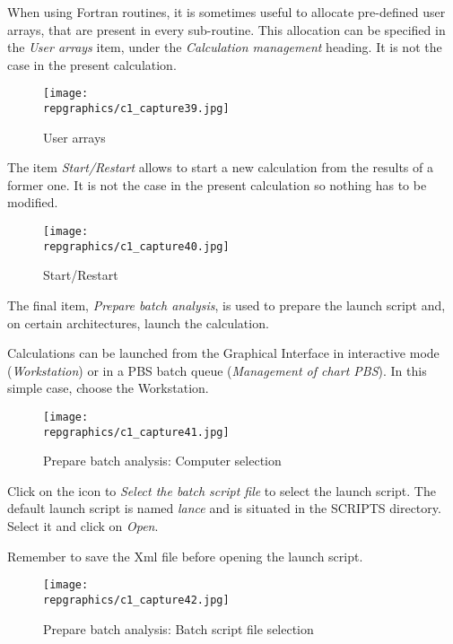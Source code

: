 \clearpage
When using Fortran routines, it is sometimes useful to allocate pre-defined user
arrays, that are present in every sub-routine. This allocation can be specified
in the {\itshape User arrays} item, under the {\itshape Calculation management}
heading. It is not the case in the present calculation.

\begin{figure}[ht]
\begin{center}
\texttt{[image: \\repgraphics/c1\_capture39.jpg]}
\caption{User arrays}
\label{fig39_e1}
\end{center}
\end{figure}


\clearpage
The item {\itshape Start/Restart} allows to start a new calculation from the
results of a former one. It is not the case in the present calculation so
nothing has to be modified.

\begin{figure}[ht]
\begin{center}
\texttt{[image: \\repgraphics/c1\_capture40.jpg]}
\caption{Start/Restart}
\label{fig40_e1}
\end{center}
\end{figure}


\clearpage
The final item, {\itshape Prepare batch analysis}, is used to prepare the launch
script and, on certain architectures, launch the calculation.

Calculations can be launched from the Graphical Interface in interactive mode
({\itshape Workstation}) or in a PBS batch queue ({\itshape Management of chart
PBS}). In this simple case, choose the Workstation.

\begin{figure}[ht]
\begin{center}
\texttt{[image: \\repgraphics/c1\_capture41.jpg]}
\caption{Prepare batch analysis: Computer selection}
\label{fig41_e1}
\end{center}
\end{figure}


\clearpage
Click on the icon to {\itshape Select the batch script file} to select the
launch script. The default launch script is named {\itshape lance} and is
situated in the SCRIPTS directory. Select it and click on {\itshape Open}.

Remember to save the Xml file before opening the launch script.

\begin{figure}[ht]
\begin{center}
\texttt{[image: \\repgraphics/c1\_capture42.jpg]}
\caption{Prepare batch analysis: Batch script file selection}
\label{fig42_e1}
\end{center}
\end{figure}


